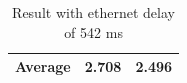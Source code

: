\begin{table}[ht!]
{\begin{tabular}{|c|c|c|}
\multicolumn{1}{|l|}{\textbf{Average}} & \textbf{2.708}                                                                                                                                      & \textbf{2.496}                                                                                                                                  \\ \hline
\end{tabular}
}
\caption{Result with ethernet delay of 542 ms}
\end{table}
